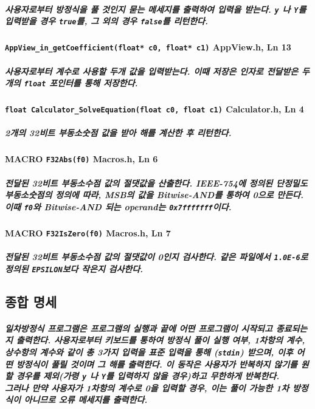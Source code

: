 \documentclass{article}
\begin{document}
    \subparagraph{\normalfont 사용자로부터 방정식을 풀 것인지 묻는 메세지를 출력하여 입력을 받는다. \texttt{y} 나 \texttt{Y}를 입력받을 경우 \texttt{true}를, 그 외의 경우 \texttt{false}를 리턴한다.}

    \paragraph{\large\texttt{AppView\_in\_getCoefficient(float* c0, float* c1)} \tiny AppView.h, Ln 13}

    \subparagraph{\normalfont 사용자로부터 계수로 사용할 두개 값을 입력받는다. 이때 저장은 인자로 전달받은 두개의 \texttt{float} 포인터를 통해 저장한다.}

    \paragraph{\large\texttt{float Calculator\_SolveEquation(float c0, float c1)} \tiny Calculator.h, Ln 4}

    \subparagraph{\normalfont 2개의 32비트 부동소숫점 값을 받아 해를 계산한 후 리턴한다.}

    \paragraph{MACRO \large\texttt{F32Abs(f0)} \tiny Macros.h, Ln 6}

    \subparagraph{ 전달된 32비트 부동소수점 값의 절댓값을 산출한다. IEEE-754에 정의된 단정밀도 부동소숫점의 정의에 따라, MSB의 값을 Bitwise-AND를 통하여 0으로 만든다. \\ 이때 \texttt{f0}와 Bitwise-AND 되는 operand는 \texttt{0x7fffffff}이다.}

    \paragraph{MACRO \large\texttt{F32IsZero(f0)} \tiny Macros.h, Ln 7}

    \subparagraph{ 전달된 32비트 부동소수점 값의 절댓값이 0인지 검사한다. 같은 파일에서 \texttt{1.0E-6}로 정의된 \texttt{EPSILON}보다 작은지 검사한다.}

    \subsection{종합 명세}

    \subparagraph{ 일차방정식 프로그램은 프로그램의 실행과 끝에 어떤 프로그램이 시작되고 종료되는지 출력한다. 
    사용자로부터 키보드를 통하여 방정식 풀이 실행 여부, 1차항의 계수, 상수항의 계수와 같이 총 3가지 입력을 표준 입력을 통해 (\texttt{stdin}) 받으며, 이후 어떤 방정식이 풀릴 것이며 그 해를 출력한다. 이 동작은 사용자가 반복하지 않기를 원할 경우를 제외(가령 \texttt{y} 나 \texttt{Y}를 입력하지 않을 경우)하고 무한하게 반복한다.\\
    그러나 만약 사용자가 1차항의 계수로 0을 입력할 경우, 이는 풀이 가능한 1차 방정식이 아니므로 오류 메세지를 출력한다.}
\end{document}
